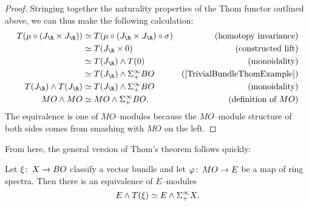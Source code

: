 \begin{proof}
Stringing together the naturality properties of the Thom functor outlined above, we can thus make the following calculation:
\begin{align*}
T(\mu \circ (J_{\R} \times J_{\R})) & \simeq T(\mu \circ (J_{\R} \times J_{\R}) \circ \sigma) & \text{(homotopy invariance)} \\
& \simeq T(J_{\R} \times 0) & \text{(constructed lift)} \\
& \simeq T(J_{\R}) \sm T(0) & \text{(monoidality)} \\
& \simeq T(J_{\R}) \sm \Susp^\infty_+ BO & \text{(\Cref{TrivialBundleThomExample})} \\
T(J_{\R}) \sm T(J_{\R}) & \simeq T(J_{\R}) \sm \Susp^\infty_+ BO & \text{(monoidality)} \\
MO \sm MO & \simeq MO \sm \Susp^\infty_+ BO. & \text{(definition of $MO$)}
\end{align*}
The equivalence is one of $MO$--modules because the $MO$--module structure of both sides comes from smashing with $MO$ on the left.
\end{proof}

\noindent From here, the general version of Thom's theorem follows quickly:

\begin{theorem}\label{GeneralThomIsom}
Let $\xi\colon\thinspace X \to BO$ classify a vector bundle and let $\varphi\colon\thinspace MO \to E$ be a map of ring spectra. Then there is an equivalence of $E$--modules \[E \wedge T(\xi) \simeq E \wedge \Sigma^\infty_+ X.\]
\end{theorem}

